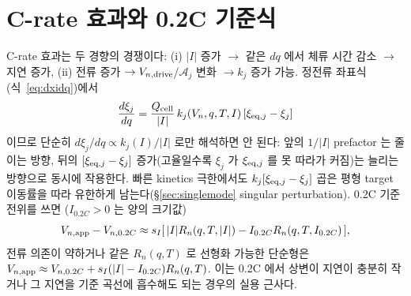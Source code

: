 \section{C-rate 효과와 0.2C 기준식}\label{sec:crate}
C-rate 효과는 두 경향의 경쟁이다: (i) $|I|$ 증가 $\to$ 같은 $dq$ 에서 체류 시간 감소 $\to$ 지연 증가,
(ii) 전류 증가 $\to V_{n,\mathrm{drive}}$/$\mathcal A_j$ 변화 $\to k_j$ 증가 가능. 정전류 좌표식
(식~\eqref{eq:dxidq})에서
\begin{equation}
\frac{d\xi_j}{dq}=\frac{Q_{\mathrm{cell}}}{|I|}\,k_j(V_n,q,T,I)\,[\xi_{\mathrm{eq},j}-\xi_j]
\label{eq:crate}
\end{equation}
이므로 단순히 $d\xi_j/dq\propto k_j(I)/|I|$ 로만 해석하면 안 된다: 앞의 $1/|I|$ prefactor 는 줄이는
방향, 뒤의 $[\xi_{\mathrm{eq},j}-\xi_j]$ 증가(고율일수록 $\xi_j$ 가 $\xi_{\mathrm{eq},j}$ 를 못 따라가 커짐)는 늘리는
방향으로 동시에 작용한다. 빠른 kinetics 극한에서도 $k_j[\xi_{\mathrm{eq},j}-\xi_j]$ 곱은 평형 target 이동률을
따라 유한하게 남는다(\S\ref{sec:singlemode} singular perturbation). 0.2C 기준 전위를 쓰면
($I_{0.2C}>0$ 는 양의 크기값)
\begin{equation}
V_{n,\mathrm{app}}-V_{n,0.2C}\approx s_I[\,|I|R_n(q,T,|I|)-I_{0.2C}R_n(q,T,I_{0.2C})\,],
\label{eq:02c_gen}
\end{equation}
전류 의존이 약하거나 같은 $R_n(q,T)$ 로 선형화 가능한 단순형은
$V_{n,\mathrm{app}}\approx V_{n,0.2C}+s_I(|I|-I_{0.2C})R_n(q,T)$. 이는 0.2C 에서 상변이 지연이 충분히 작거나 그
지연을 기준 곡선에 흡수해도 되는 경우의 실용 근사다.

